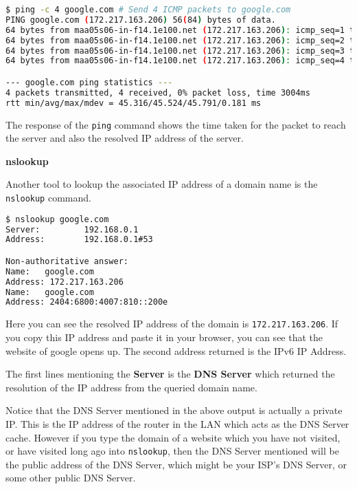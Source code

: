 \begin{lstlisting}[language=bash]
$ ping -c 4 google.com # Send 4 ICMP packets to google.com
PING google.com (172.217.163.206) 56(84) bytes of data.
64 bytes from maa05s06-in-f14.1e100.net (172.217.163.206): icmp_seq=1 ttl=114 time=45.6 ms
64 bytes from maa05s06-in-f14.1e100.net (172.217.163.206): icmp_seq=2 ttl=114 time=45.4 ms
64 bytes from maa05s06-in-f14.1e100.net (172.217.163.206): icmp_seq=3 ttl=114 time=45.3 ms
64 bytes from maa05s06-in-f14.1e100.net (172.217.163.206): icmp_seq=4 ttl=114 time=45.8 ms

--- google.com ping statistics ---
4 packets transmitted, 4 received, 0% packet loss, time 3004ms
rtt min/avg/max/mdev = 45.316/45.524/45.791/0.181 ms
\end{lstlisting}

The response of the \texttt{ping} command shows the
time taken for the packet to reach the server and
also the resolved IP address of the server.

\textbf{nslookup}

Another tool to lookup the associated IP address of
a domain name is the \texttt{nslookup} command.

\begin{lstlisting}[language=bash]
$ nslookup google.com
Server:         192.168.0.1
Address:        192.168.0.1#53

Non-authoritative answer:
Name:   google.com
Address: 172.217.163.206
Name:   google.com
Address: 2404:6800:4007:810::200e
\end{lstlisting}

Here you can see the resolved IP address of the domain
is \texttt{172.217.163.206}. If you copy this IP address
and paste it in your browser, you can see that the
website of google opens up.
The second address returned is the IPv6 IP Address.

The first lines mentioning the \textbf{Server}
is the \textbf{DNS Server} which returned the
resolution of the IP address from the queried
domain name.

\begin{remark}
  Notice that the DNS Server mentioned in the above
  output is actually a private IP. This is the IP
  address of the router in the LAN which acts as
  the DNS Server cache. However if you type the
  domain of a website which you have not visited,
  or have visited long ago into \texttt{nslookup},
  then the DNS Server mentioned will be the public
  address of the DNS Server, which might be your
  ISP's DNS Server, or some other public DNS Server.
\end{remark}

